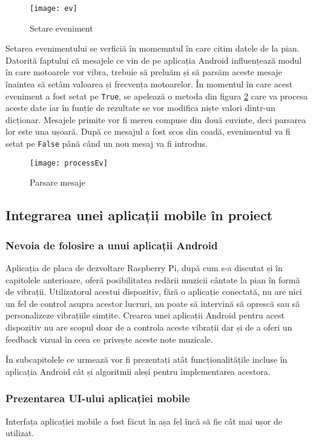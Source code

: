 \documentclass[../IoMusT.tex]{subfiles}
\begin{document}
\begin{figure}[h]
\centering
\texttt{[image: ev]}
\caption{Setare eveniment}
\label{fig:ev}
\end{figure}  
Setarea evenimentului se verficiă în momemntul în care citim datele de la pian. Datorită faptului că mesajele ce vin de pe aplicația Android influențează modul în care motoarele vor vibra, trebuie să preluăm și să parsăm aceste mesaje înaintea să setâm valoarea și frecvența motoarelor. În momentul în care acest eveniment a fost setat pe \verb|True|, se apelează o metoda din figura \ref{fig:processEv} care va procesa aceste date iar în funție de rezultate se vor modifica niște valori dintr-un dicționar. Mesajele primite vor fi mereu compuse din două cuvinte, deci parsarea lor este una ușoară. După ce mesajul a fost scos din coadă, evenimentul va fi setat pe \verb|False| până când un nou mesaj va fi introdus.
\begin{figure}[h]
\centering
\texttt{[image: processEv]}
\caption{Parsare mesaje}
\label{fig:processEv}
\end{figure}  
\subsection{Integrarea unei aplicații mobile în proiect}
\subsubsection{Nevoia de folosire a unui aplicații Android}
Aplicația de placa de dezvoltare Raspberry Pi, după cum s-a discutat și în capitolele anterioare, oferă posibilitatea redării muzicii cântate la pian în formă de vibrații. Utilizatorul acestui dispozitiv, fără o aplicație conectată, nu are nici un fel de control asupra acestor lucruri, nu poate să intervină să oprescă sau să personalizeze vibrațiile simțite. Crearea unei aplicații Android pentru acest dispozitiv nu are scopul doar de a controla aceste vibrații dar și de a oferi un feedback vizual în ceea ce privește aceste note muzicale. 
\\
\par În subcapitolele ce urmează vor fi prezentați atât funcționalitățile incluse în aplicația Android cât și algoritmii aleși pentru implementarea acestora.
\subsubsection{Prezentarea UI-ului aplicației mobile}
Interfața aplicației mobile a fost făcut în așa fel încă să fie cât mai ușor de utilizat.
\end{document}
